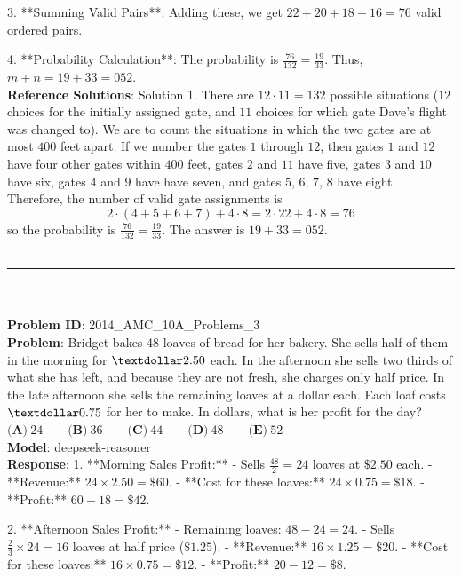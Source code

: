 {3. **Summing Valid Pairs**: Adding these, we get \(22 + 20 + 18 + 16 = 76\) valid ordered pairs.

4. **Probability Calculation**: The probability is \(\frac{76}{132} = \frac{19}{33}\). Thus, \(m + n = 19 + 33 = \boxed{052}\). \\
    \textbf{Reference Solutions}: Solution 1. There are $12 \cdot 11 = 132$ possible situations ($12$ choices for the initially assigned gate, and $11$ choices for which gate Dave's flight was changed to). We are to count the situations in which the two gates are at most $400$ feet apart.
If we number the gates $1$ through $12$, then gates $1$ and $12$ have four other gates within $400$ feet, gates $2$ and $11$ have five, gates $3$ and $10$ have six, gates $4$ and $9$ have have seven, and gates $5$, $6$, $7$, $8$ have eight. Therefore, the number of valid gate assignments is \[2\cdot(4+5+6+7)+4\cdot8 = 2 \cdot 22 + 4 \cdot 8 = 76\] so the probability is $\frac{76}{132} = \frac{19}{33}$. The answer is $19 + 33 = \boxed{052}$. \\
    \vspace{0.3cm} \\
    \hrule \\
    \vspace{0.5cm} \\
    \textbf{Problem ID}: 2014_AMC_10A_Problems_3 \\
    \textbf{Problem}: Bridget bakes 48 loaves of bread for her bakery. She sells half of them in the morning for $\textdollar 2.50$ each. In the afternoon she sells two thirds of what she has left, and because they are not fresh, she charges only half price. In the late afternoon she sells the remaining loaves at a dollar each. Each loaf costs $\textdollar 0.75$ for her to make. In dollars, what is her profit for the day?
$\textbf{(A)}\ 24\qquad\textbf{(B)}\ 36\qquad\textbf{(C)}\ 44\qquad\textbf{(D)}\ 48\qquad\textbf{(E)}\ 52$ \\
    \textbf{Model}: deepseek-reasoner \\
    \textbf{Response}: 1. **Morning Sales Profit:**
   - Sells \( \frac{48}{2} = 24 \) loaves at \( \$2.50 \) each.
   - **Revenue:** \( 24 \times 2.50 = \$60 \).
   - **Cost for these loaves:** \( 24 \times 0.75 = \$18 \).
   - **Profit:** \( 60 - 18 = \$42 \).

2. **Afternoon Sales Profit:**
   - Remaining loaves: \( 48 - 24 = 24 \).
   - Sells \( \frac{2}{3} \times 24 = 16 \) loaves at half price (\( \$1.25 \)).
   - **Revenue:** \( 16 \times 1.25 = \$20 \).
   - **Cost for these loaves:** \( 16 \times 0.75 = \$12 \).
   - **Profit:** \( 20 - 12 = \$8 \).

}
